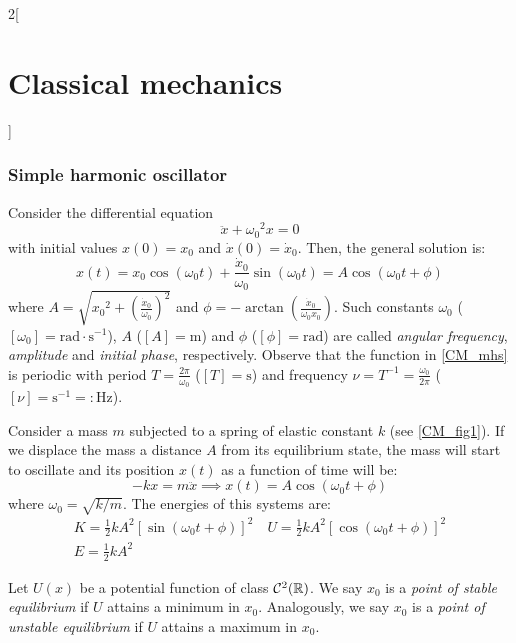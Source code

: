 \documentclass[../../../main.tex]{subfiles}
\begin{document}
\begin{multicols}{2}[\section{Classical mechanics}]
  \subsubsection{Simple harmonic oscillator}
  \begin{proposition}
    Consider the differential equation $$\ddot{x}+{\omega_0}^2 x=0$$ with initial values $x(0)=x_0$ and $\dot{x}(0)=\dot{x}_0$. Then, the general solution is:
    \begin{equation}
      x(t)=x_0\cos(\omega_0t)+\frac{\dot{x}_0}{\omega_0}\sin(\omega_0t)=A\cos(\omega_0t+\phi)
      \label{CM_mhs}
    \end{equation} where $\displaystyle A=\sqrt{{x_0}^2+{\left(\frac{\dot{x}_0}{\omega_0}\right)}^2}$ and $\displaystyle \phi=-\arctan\left(\frac{\dot{x}_0}{\omega_0x_0}\right)$. Such constants $\omega_0$ ($[\omega_0]=\text{rad}\cdot \text{s}^{-1}$), $A$ ($[A]=\text{m}$) and $\phi$ ($[\phi]=\text{rad}$) are called \emph{angular frequency}, \emph{amplitude} and \emph{initial phase}, respectively. Observe that the function in \cref{CM_mhs} is periodic with period $T=\frac{2\pi}{\omega_0}$ ($[T]=\text{s}$) and frequency $\nu=T^{-1}=\frac{\omega_0}{2\pi}$ ($[\nu]=\text{s}^{-1}=:\text{Hz}$).
  \end{proposition}
  \begin{proposition}
    Consider a mass $m$ subjected to a spring of elastic constant $k$ (see \cref{CM_fig1}). If we displace the mass a distance $A$ from its equilibrium state, the mass will start to oscillate and its position $x(t)$ as a function of time will be:
    $$-kx=m\ddot{x}\implies x(t)=A\cos(\omega_0t+\phi)$$ where $\omega_0=\sqrt{k/m}$. The energies of this systems are:
    \begin{gather*}
      K=\frac{1}{2}kA^2{\left[\sin(\omega_0 t+\phi)\right]}^2\quad U=\frac{1}{2}kA^2{\left[\cos(\omega_0 t+\phi)\right]}^2\\
      E=\frac{1}{2}kA^2
    \end{gather*}
    \begin{center}
      \begin{minipage}{\linewidth}
        \centering
        
        \label{CM_fig1}
      \end{minipage}
    \end{center}
  \end{proposition}
  \begin{definition}
    Let $U(x)$ be a potential function of class $\mathcal{C}^2(\mathbb{R})$. We say $x_0$ is a \emph{point of stable equilibrium} if $U$ attains a minimum in $x_0$. Analogously, we say $x_0$ is a \emph{point of unstable equilibrium} if $U$ attains a maximum in $x_0$.

\end{definition}
\end{multicols}
\end{document}
